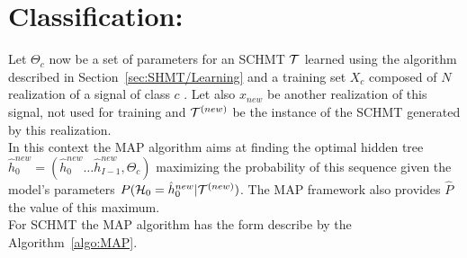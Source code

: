 \documentclass[a4paper,11pt]{report}
\begin{document}
  \section{Classification:}
    \label{sec:SHMT/Clf}
    
    Let $\Theta_{c}$ now be a set of parameters for an SCHMT $\mathcal{T}$ learned using the algorithm described in Section~\ref{sec:SHMT/Learning} and a training set $X_{c}$ composed of $N$ realization of a signal of class $c$ . Let also $x_{new}$ be another realization of this signal, not used for training and $\mathcal{T}^{(new)}$ be the instance of the SCHMT generated by this realization.\\
    
    In this context the MAP algorithm aims at finding the optimal hidden tree $\hat{h}_{0}^{new}=(\hat{h}_{0}^{new} \dots \hat{h}_{I-1}^{new},\Theta_{c})$ maximizing the probability of this sequence given the model's parameters $P(\mathcal{H}_{0}= \hat{h}_{0}^{new}|\mathcal{T}^{(new)})$. The MAP framework also provides $\hat{P}$ the value of this maximum.\\
    
    For SCHMT the MAP algorithm has the form describe by the Algorithm~\ref{algo:MAP}.
    
\end{document}
